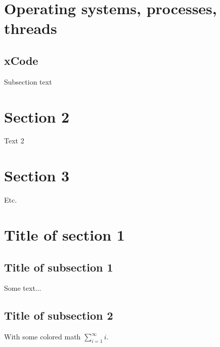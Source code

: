 \section{Operating systems, processes, threads}


\subsection{xCode}
Subsection text

\section{Section 2}
Text 2

\section{Section 3}
Etc.

\section{Title of section 1}

\subsection*{Title of subsection 1}
Some text...

\subsection*{Title of subsection 2}
With some colored math $\sum_{i=1}^\infty i$.

